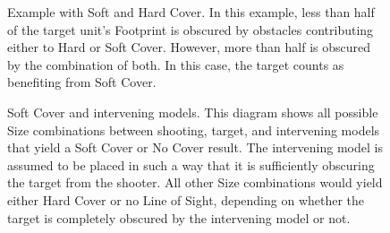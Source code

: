 \begin{figure}[!htbp]
\begin{minipage}[t]{0.55\textwidth}
\def\svgwidth{\textwidth}

\end{minipage}\hfill\begin{minipage}[b]{0.42\textwidth}
\caption{Example with Soft and Hard Cover.\captionpar
In this example, less than half of the target unit's Footprint is obscured by obstacles contributing either to Hard or Soft Cover. However, more than half is obscured by the combination of both. In this case, the target counts as benefiting from Soft Cover.}
\label{figure/soft_and_hard_cover}
\end{minipage}
\end{figure}

\newcommand{\figureLoSCSoftcover}{\Largefontsize{Soft Cover (-1 to hit)}}
\newcommand{\figureLoSCNocover}{\Largefontsize{No Cover}}
\newcommand{\figureLoSCStandard}{Standard}
\newcommand{\figureLoSCLarge}{Large}
\newcommand{\figureLoSCGigantic}{Gigantic}

\begin{figure}[!htbp]
\centering
\def\svgwidth{\textwidth}

\caption{Soft Cover and intervening models.\captionpar
This diagram shows all possible Size combinations between shooting, target, and intervening models that yield a Soft Cover or No Cover result. The intervening model is assumed to be placed in such a way that it is sufficiently obscuring the target from the shooter. All other Size combinations would yield either Hard Cover or no Line of Sight, depending on whether the target is completely obscured by the intervening model or not.}
\label{figure/soft_cover_and_intervening_models}
\end{figure}
